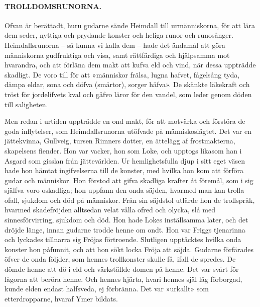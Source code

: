 \paragraph{TROLLDOMSRUNORNA.}

Ofvan är berättadt, huru gudarne sände Heimdall till urmänniskorna, för
att lära dem seder, nyttiga och prydande konster och heliga runor och
runosånger. Heimdallsrunorna -- så kunna vi kalla dem -- hade det
ändamål att göra människorna gudfruktiga och visa, samt rättfärdiga och
hjälpsamma mot hvarandra, och att förläna dem makt att kufva eld och
vind, när dessa uppträdde skadligt. De voro till för att »människor
frälsa, lugna hafvet, fågelsång tyda, dämpa eldar, sona och döfva
(smärtor), sorger häfva». De skänkte läkekraft och tröst för
jordelifvets kval och gåfvo läror för den vandel, som leder genom döden
till saligheten.

Men redan i urtiden uppträdde en ond makt, för att motvärka och förstöra
de goda inflytelser, som Heimdallsrunorna utöfvade på människoslägtet.
Det var en jättekvinna, Gullveig, tursen Rimners dotter, en ättelägg af
frostmakterna, skapelsens fiender. Hon var vacker, hon som Loke, och
upptogs likasom han i Asgard som gisslan från jättevärlden. Ur
hemlighetsfulla djup i sitt eget väsen hade hon hämtat ingifvelserna
till de konster, med hvilka hon kom att förföra gudar och människor. Hon
förstod att gifva skadliga krafter åt föremål, som i sig själfva voro
oskadliga; hon uppfann den onda säjden, hvarmed man kan trolla ofall,
sjukdom och död på människor. Från sin säjdstol utlärde hon de
trollspråk,
\protect\hypertarget{lb1625905.xhtmlux5cux23start39}{}{}\protect\hypertarget{lb1625905.xhtmlux5cux23start39-a}{}{}\protect\hypertarget{lb1625905.xhtmlux5cux23start39-b}{}{}\protect\hypertarget{lb1625905.xhtmlux5cux23start39-c}{}{}\protect\hypertarget{lb1625905.xhtmlux5cux23start39-d}{}{}
hvarmed skadefröjden alltsedan velat vålla ofred och olycka, slå med
sinnesförvirring, sjukdom och död. Hon hade Lokes inställsamma later,
och det dröjde länge, innan gudarne trodde henne om ondt. Hon var Friggs
tjenarinna och lyckades tillnarra sig Fröjas förtroende. Slutligen
upptäcktes hvilka onda konster hon påfunnit, och att hon sökt locka
Fröja att säjda. Gudarne förfärades öfver de onda följder, som hennes
trollkonster skulle få, ifall de spredes. De dömde henne att dö i eld
och värkställde domen på henne. Det var svårt för lågorna att beröra
henne. Och hennes hjärta, hvari hennes själ låg förborgad, kunde elden
endast halfsveda, ej förbränna. Det var »urkallt» som etterdropparne,
hvaraf Ymer bildats.

